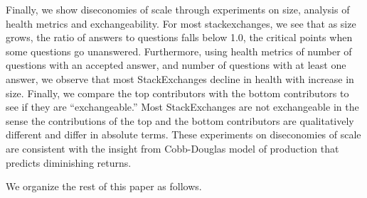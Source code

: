 Finally, we show diseconomies of scale through experiments on size, analysis of health metrics and exchangeability. For most stackexchanges, we see that as size grows, the ratio of answers to questions falls below 1.0, the critical points when some questions go unanswered. Furthermore, using health metrics of number of questions with an accepted answer, and number of questions with at least one answer, we observe that most StackExchanges decline in health with increase in size. Finally, we compare the top contributors with the bottom contributors to see if they are ``exchangeable.'' Most StackExchanges are not exchangeable in the sense the contributions of the top and the bottom contributors are qualitatively different and differ in absolute terms. These experiments on diseconomies of scale are consistent with the insight from Cobb-Douglas model of production that predicts diminishing returns.

We organize the rest of this paper as follows.





